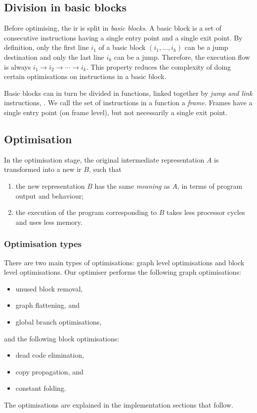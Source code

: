 \subsection*{Division in basic blocks}
Before optimising, the ir is split in \emph{basic blocks}. A basic block is a set of consecutive instructions having a single entry point and a single exit point. By definition, only the first line $i_1$ of a basic block $(i_1, \ldots, i_k)$ can be a jump destination and only the last line $i_k$ can be a jump. Therefore, the execution flow is always $i_1\rightarrow i_2 \rightarrow \cdots \rightarrow i_k$. This property reduces the complexity of doing certain optimisations on instructions in a basic block.

Basic blocks can in turn be divided in functions, linked together by \emph{jump and link} instructions, . We call the set of instructions in a function a \emph{frame}. Frames have a single entry point (on frame level), but not necessarily a single exit point.

\subsection*{Optimisation}
In the optimisation stage, the original intermediate representation $A$ is transformed into a new ir $B$, such that
\begin{enumerate}
\item the new representation $B$ has the same \emph{meaning} as $A$, in terms of program output and behaviour;
\item the execution of the program corresponding to $B$ takes less processor cycles and uses less memory.
\end{enumerate}

\subsubsection*{Optimisation types}
There are two main types of optimisations: graph level optimisations and block level optimisations. 
Our optimiser performs the following graph optimisations:
\begin{itemize}
\item unused block removal,
\item graph flattening, and
\item global branch optimisations,
\end{itemize}
and the following block optimisations:
\begin{itemize}
\item dead code elimination,
\item copy propagation, and
\item constant folding.
\end{itemize}
The optimisations are explained in the implementation sections that follow.


